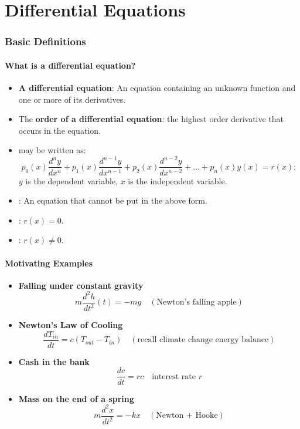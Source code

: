 \documentclass{article}
\begin{document}
\part{Differential Equations}

\section{Basic Definitions}
\subsection{What is a differential equation?}

\begin{itemize}
\item
\textbf{A differential equation}: An equation containing an
unknown function and one or more of its derivatives.
\item
\noindent The {\bf order of a differential equation}: the highest
order derivative that occurs in the equation.
\item
{} may be written as:
$$
p_0(x) \frac{ d^n y}{d x^n} +p_1(x) \frac{ d^{n-1} y}{d x^{n-1}}
+p_2(x) \frac{ d^{n-2} y}{d x^{n-2}}+\ldots + p_n(x) y(x)=r(x);
$$
$y$ is the dependent variable, $ x$ is the independent variable.
\item
{}: An equation
that cannot be put in the above form.
\item
{}: $r(x)=0$.
\item
{}: $r(x) \ne 0.$
\end{itemize}


\subsection{Motivating Examples}

\begin{itemize}
\item
\textbf{Falling under constant gravity}
$$
m \frac{d^2h}{dt^2} (t) = -mg \quad (\mbox{Newton's falling apple})
$$
\item
\textbf{Newton's Law of Cooling}
$$
\frac{dT_{in}}{dt} = c (T_{out} - T_{in}) \quad (\mbox{recall climate change energy balance})
$$
\item
\textbf{Cash in the bank}
$$
\frac{dc}{dt} = r c\quad \mbox{interest rate } r
$$
\item
\textbf{Mass on the end of a spring}
$$
m \frac{d^2 x}{dt^2} = -k x \quad (\mbox{Newton + Hooke})
$$
\end{itemize}
\end{document}
